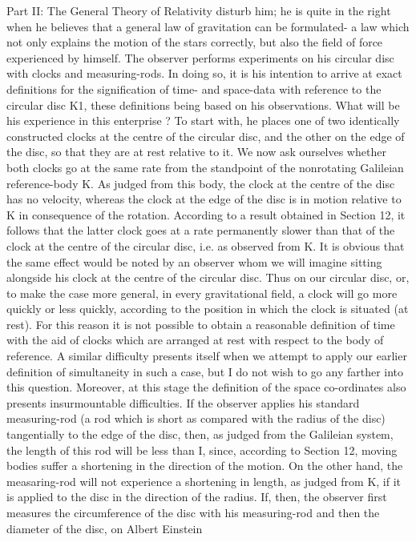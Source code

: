 \documentclass{article}
\begin{document}
Part II: The General Theory of Relativity
disturb him; he is quite in the right when he believes that a general law of gravitation can be
formulated- a law which not only explains the motion of the stars correctly, but also the
field of force experienced by himself.
The observer performs experiments on his circular disc with clocks and measuring-rods.
In doing so, it is his intention to arrive at exact definitions for the signification of time- and
space-data with reference to the circular disc K1, these definitions being based on his
observations. What will be his experience in this enterprise ?
To start with, he places one of two identically constructed clocks at the centre of the
circular disc, and the other on the edge of the disc, so that they are at rest relative to it. We
now ask ourselves whether both clocks go at the same rate from the standpoint of the nonrotating Galileian reference-body K. As judged from this body, the clock at the centre of the
disc has no velocity, whereas the clock at the edge of the disc is in motion relative to K in
consequence of the rotation. According to a result obtained in Section 12, it follows that the
latter clock goes at a rate permanently slower than that of the clock at the centre of the
circular disc, i.e. as observed from K. It is obvious that the same effect would be noted by
an observer whom we will imagine sitting alongside his clock at the centre of the circular
disc. Thus on our circular disc, or, to make the case more general, in every gravitational
field, a clock will go more quickly or less quickly, according to the position in which the
clock is situated (at rest). For this reason it is not possible to obtain a reasonable definition
of time with the aid of clocks which are arranged at rest with respect to the body of
reference. A similar difficulty presents itself when we attempt to apply our earlier definition
of simultaneity in such a case, but I do not wish to go any farther into this question.
Moreover, at this stage the definition of the space co-ordinates also presents
insurmountable difficulties. If the observer applies his standard measuring-rod (a rod which
is short as compared with the radius of the disc) tangentially to the edge of the disc, then, as
judged from the Galileian system, the length of this rod will be less than I, since, according
to Section 12, moving bodies suffer a shortening in the direction of the motion. On the other
hand, the measaring-rod will not experience a shortening in length, as judged from K, if it is
applied to the disc in the direction of the radius. If, then, the observer first measures the
circumference of the disc with his measuring-rod and then the diameter of the disc, on
Albert Einstein
\end{document}
